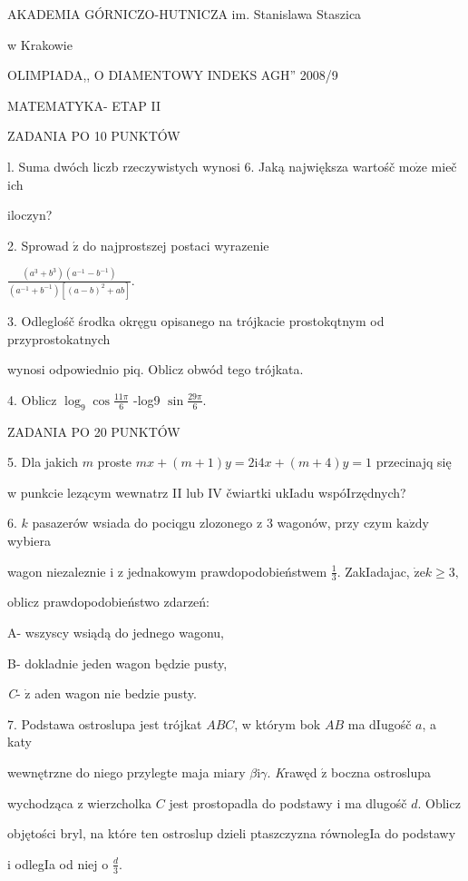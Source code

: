 \documentclass[a4paper,12pt]{article}
\begin{document}
AKADEMIA GÓRNICZO-HUTNICZA im. Stanislawa Staszica

w Krakowie

OLIMPIADA,, O DIAMENTOWY INDEKS AGH'' 2008/9

MATEMATYKA- ETAP II

ZADANIA PO 10 PUNKTÓW

l. Suma dwóch liczb rzeczywistych wynosi 6. Jaką największa wartośč $\mathrm{m}\mathrm{o}\dot{\mathrm{z}}\mathrm{e}$ mieč ich

iloczyn?

2. Sprowad $\acute{\mathrm{z}}$ do najprostszej postaci wyrazenie

$\displaystyle \frac{(a^{3}+b^{3})(a^{-1}-b^{-1})}{(a^{-1}+b^{-1})[(a-b)^{2}+ab]}.$

3. Odleglośč środka okręgu opisanego na trójkacie prostokqtnym od przyprostokatnych

wynosi odpowiednio piq. Oblicz obwód tego trójkata.

4. Oblicz $\displaystyle \log_{9}\cos\frac{11\pi}{6}$ -log9 $\displaystyle \sin\frac{29\pi}{6}.$

ZADANIA PO 20 PUNKTÓW

5. Dla jakich $m$ proste $mx+(m+1)y = 2 \mathrm{i} 4x+(m+4)y = 1$ przecinajq się

w punkcie lezącym wewnatrz II lub IV čwiartki ukIadu wspóIrzędnych?

6. $k$ pasazerów wsiada do pociqgu zlozonego z 3 wagonów, przy czym $\mathrm{k}\mathrm{a}\dot{\mathrm{z}}\mathrm{d}\mathrm{y}$ wybiera

wagon niezaleznie i z jednakowym prawdopodobieństwem $\displaystyle \frac{1}{3}$. ZakIadajac, $\dot{\mathrm{z}}\mathrm{e}k\geq 3,$

oblicz prawdopodobieństwo zdarzeń:

A- wszyscy wsiądą do jednego wagonu,

B- dokladnie jeden wagon będzie pusty,

{\it C}- $\dot{\mathrm{z}}$ aden wagon nie bedzie pusty.

7. Podstawa ostroslupa jest trójkat $ABC$, w którym bok $AB$ ma dIugośč $a$, a katy

wewnętrzne do niego przylegte maja miary $\beta \mathrm{i} \gamma.$ {\it K}rawęd $\acute{\mathrm{z}}$ boczna ostroslupa

wychodząca z wierzcholka $C$ jest prostopadla do podstawy i ma dlugośč $d$. Oblicz

objętości bryl, na które ten ostroslup dzieli ptaszczyzna równolegIa do podstawy

i odlegIa od niej o $\displaystyle \frac{d}{3}.$
\end{document}
